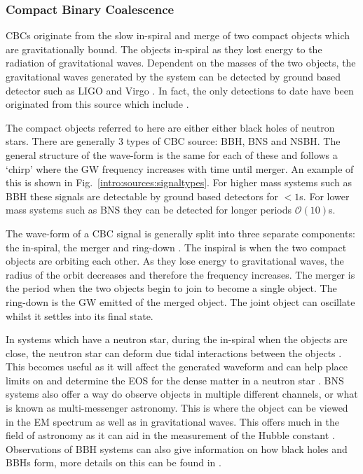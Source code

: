 \subsubsection{\label{sources:transient:cbc} Compact Binary Coalescence}

\acp{CBC} originate from the slow in-spiral and merge of two compact objects which are gravitationally bound.
The objects in-spiral as they lost energy to the radiation of gravitational waves.
Dependent on the masses of the two objects, the gravitational waves generated by the system can be detected by ground based detector such as LIGO \citep{aasi2015AdvancedLIGO} and Virgo \citep{acernese2015AdvancedVirgo}. 
In fact, the only detections to date have been originated from this source which include \citep{abbott2016ObservationGravitational, abbott2017GW170814ThreeDetector, abbott2017GW170817Observation}.

The compact objects referred to here are either either black holes of neutron stars.
There are generally 3 types of \ac{CBC} source: \ac{BBH}, \ac{BNS} and \ac{NSBH}.
The general structure of the wave-form is the same for each of these and follows a `chirp' where the \ac{GW} frequency increases with time until merger. An example of this is shown in Fig.~\ref{intro:sources:signaltypes}.
For higher mass systems such as \ac{BBH} these signals are detectable by ground based detectors for $< 1$s. 
For lower mass systems such as \ac{BNS} they can be detected for longer periods $\mathcal{O}(10)$s. 

The wave-form of a \ac{CBC} signal is generally split into three separate components: the in-spiral, the merger and ring-down \citep{}. 
The inspiral is when the two compact objects are orbiting each other. As they lose energy to gravitational waves, the radius of the orbit decreases and therefore the frequency increases.
The merger is the period when the two objects begin to join to become a single object.
The ring-down is the \ac{GW} emitted of the merged object. The joint object can oscillate whilst it settles into its final state. 

In systems which have a neutron star, during the in-spiral when the objects are close, the neutron star can deform due tidal interactions between the objects \citep{hernandezvivanco2019MeasuringNeutron,harry2018ObservingMeasuring}. 
This becomes useful as it will affect the generated waveform and can help place limits on and determine the \ac{EOS} for the dense matter in a neutron star \citep{hernandezvivanco2019MeasuringNeutron,harry2018ObservingMeasuring}.
\ac{BNS} systems also offer a way do observe objects in multiple different channels, or what is known as multi-messenger astronomy. 
This is where the object can be viewed in the \ac{EM} spectrum as well as in gravitational waves.
This offers much in the field of astronomy as it can aid in the measurement of the Hubble constant \citep{theligoscientificcollaborationandthevirgocollaboration2017GravitationalwaveStandard}. 
Observations of \ac{BBH} systems can also give information on how black holes and \acp{BBH} form, more details on this can be found in \citep{zevin2017ConstrainingFormation,mandel2018MergingStellarmass}.


